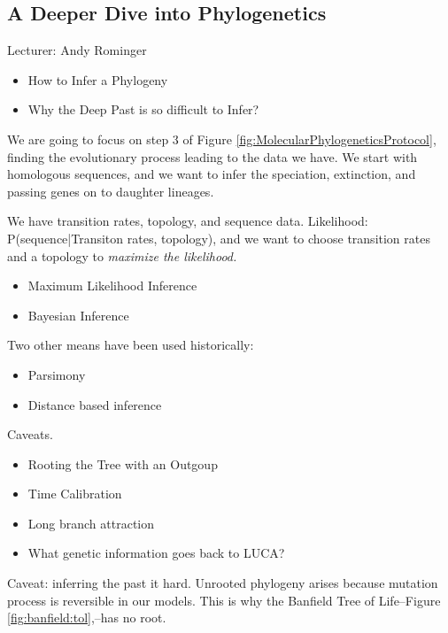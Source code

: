 \documentclass[]{article}
\begin{document}
\subsection{A Deeper Dive into Phylogenetics}

Lecturer: Andy Rominger
\begin{itemize}
	\item How to Infer a Phylogeny
	\item Why the Deep Past is so difficult to Infer?
\end{itemize}

We are going to focus on step 3 of Figure \ref{fig:MolecularPhylogeneticsProtocol}, finding the evolutionary process leading to the data we have. We start with homologous sequences, and we want to infer the speciation, extinction, and passing genes on to daughter lineages.

We have transition rates, topology, and sequence data.
Likelihood: P(sequence|Transiton rates, topology), and we want to choose transition rates and a topology to \textit{maximize the likelihood.}

\begin{itemize}
	\item Maximum Likelihood Inference\cite{huelsenbeck1997phylogeny}
	\item Bayesian Inference\cite{huelsenbeck2001mrbayes}
\end{itemize}

Two other means have been used historically:
\begin{itemize}
	\item Parsimony
	\item Distance based inference
\end{itemize}

Caveats.
\begin{itemize}
	\item Rooting the Tree with an Outgoup
	\item Time Calibration
	\item Long branch attraction
	\item What genetic information goes back to LUCA?
\end{itemize}

Caveat: inferring the past it hard. Unrooted phylogeny arises because mutation process is reversible in our models. This is why the Banfield Tree of Life--Figure \ref{fig:banfield:tol}\cite{hug2016new},--has no root.
\end{document}
